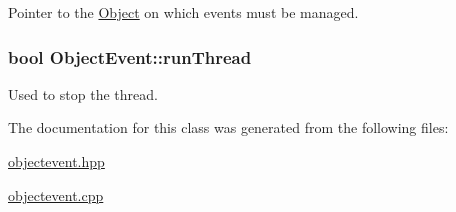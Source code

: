 Pointer to the \hyperlink{classObject}{Object} on which events must be managed. 

\hypertarget{classObjectEvent_507af79e039621e6c2dab1af54c8653b}{
\subsubsection[runThread]{\setlength{\rightskip}{0pt plus 5cm}bool {\bf ObjectEvent::runThread}}}
\label{classObjectEvent_507af79e039621e6c2dab1af54c8653b}


Used to stop the thread. 



The documentation for this class was generated from the following files:\begin{CompactItemize}
\item 
\hyperlink{objectevent_8hpp}{objectevent.hpp}\item 
\hyperlink{objectevent_8cpp}{objectevent.cpp}\end{CompactItemize}

